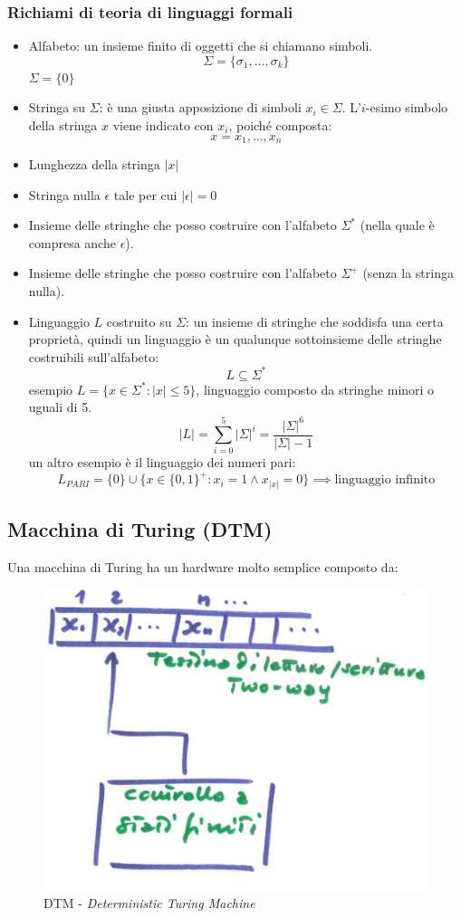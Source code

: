 \documentclass{article}
\begin{document}
\subsubsection{Richiami di teoria di linguaggi formali}
\begin{itemize}
    \item Alfabeto: un insieme finito di oggetti che si chiamano simboli.
          $$\Sigma=\{\sigma_1,\dots,\sigma_k\}$$
          $\Sigma=\{0\}$
    \item Stringa su $\Sigma$: è una giusta apposizione di simboli $x_i\in\Sigma$.
          L'$i$-esimo simbolo della stringa $x$ viene indicato con $x_i$, poiché composta:
          $$x=x_1,\dots,x_n$$
    \item Lunghezza della stringa $|x|$
    \item Stringa nulla $\epsilon$ tale per cui $|\epsilon|=0$
    \item Insieme delle stringhe che posso costruire con l'alfabeto $\Sigma^*$ (nella quale è compresa anche $\epsilon$).
    \item Insieme delle stringhe che posso costruire con l'alfabeto $\Sigma^+$ (senza la stringa nulla).
    \item Linguaggio $L$ costruito su $\Sigma$: un insieme di stringhe che soddisfa una certa proprietà,
          quindi un linguaggio è un qualunque sottoinsieme delle stringhe costruibili sull'alfabeto:
          $$L\subseteq\Sigma^*$$
          esempio $L=\{x\in\Sigma^*:|x|\leq 5\}$, linguaggio composto da stringhe minori o uguali di 5.
          $$|L|=\sum_{i=0}^5|\Sigma|^i=\frac{{|\Sigma|}^6}{|\Sigma|-1}$$
          un altro esempio è il linguaggio dei numeri pari:
          $$L_{PARI}=\{0\} \cup \{x\in\{0,1\}^+ : x_i=1 \land x_{|x|}=0\} \implies\text{linguaggio infinito}$$
\end{itemize}

\subsection{Macchina di Turing (DTM)}
Una macchina di Turing ha un hardware molto semplice composto da:
\begin{figure}[H]
    \centering
    \includegraphics[scale=0.5]{images/DTM.png}
    \caption{DTM - \textit{Deterministic Turing Machine}}
\end{figure}
\end{document}
